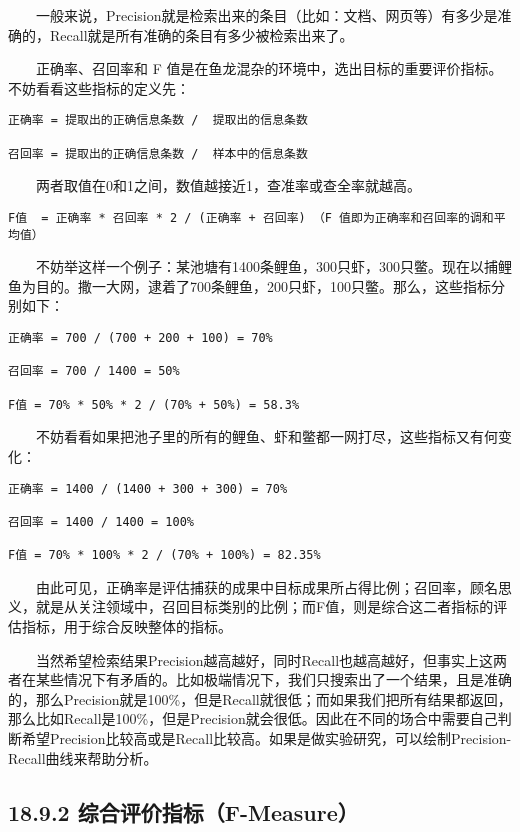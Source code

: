   一般来说，Precision就是检索出来的条目（比如：文档、网页等）有多少是准确的，Recall就是所有准确的条目有多少被检索出来了。

  正确率、召回率和 F
值是在鱼龙混杂的环境中，选出目标的重要评价指标。不妨看看这些指标的定义先：

\begin{verbatim}
正确率 = 提取出的正确信息条数 /  提取出的信息条数 

召回率 = 提取出的正确信息条数 /  样本中的信息条数    
\end{verbatim}

  两者取值在0和1之间，数值越接近1，查准率或查全率就越高。

\begin{verbatim}
F值  = 正确率 * 召回率 * 2 / (正确率 + 召回率) （F 值即为正确率和召回率的调和平均值）
\end{verbatim}

  不妨举这样一个例子：某池塘有1400条鲤鱼，300只虾，300只鳖。现在以捕鲤鱼为目的。撒一大网，逮着了700条鲤鱼，200只虾，100只鳖。那么，这些指标分别如下：

\begin{verbatim}
正确率 = 700 / (700 + 200 + 100) = 70%

召回率 = 700 / 1400 = 50%

F值 = 70% * 50% * 2 / (70% + 50%) = 58.3%
\end{verbatim}

  不妨看看如果把池子里的所有的鲤鱼、虾和鳖都一网打尽，这些指标又有何变化：

\begin{verbatim}
正确率 = 1400 / (1400 + 300 + 300) = 70%

召回率 = 1400 / 1400 = 100%

F值 = 70% * 100% * 2 / (70% + 100%) = 82.35%        
\end{verbatim}

  由此可见，正确率是评估捕获的成果中目标成果所占得比例；召回率，顾名思义，就是从关注领域中，召回目标类别的比例；而F值，则是综合这二者指标的评估指标，用于综合反映整体的指标。

  当然希望检索结果Precision越高越好，同时Recall也越高越好，但事实上这两者在某些情况下有矛盾的。比如极端情况下，我们只搜索出了一个结果，且是准确的，那么Precision就是100\%，但是Recall就很低；而如果我们把所有结果都返回，那么比如Recall是100\%，但是Precision就会很低。因此在不同的场合中需要自己判断希望Precision比较高或是Recall比较高。如果是做实验研究，可以绘制Precision-Recall曲线来帮助分析。

\subsection{18.9.2
综合评价指标（F-Measure）}\label{ux7efcux5408ux8bc4ux4ef7ux6307ux6807f-measure}

